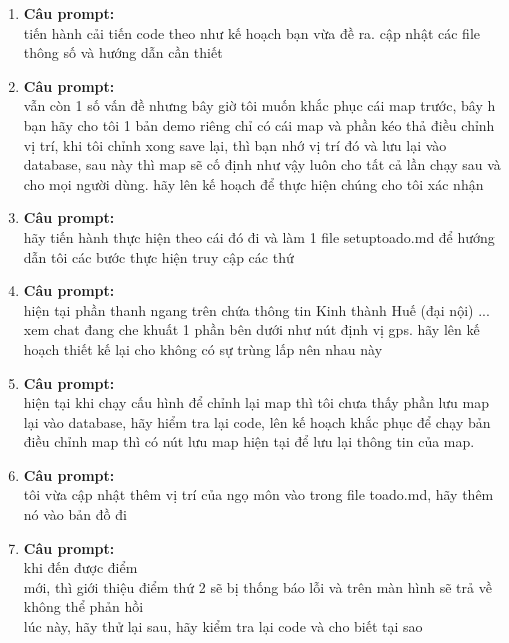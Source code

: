 \begin{enumerate}
\item \textbf{Câu prompt:} \\
\* tiến hành cải tiến code theo như kế hoạch bạn vừa đề ra. cập nhật các file thông số và hướng dẫn cần thiết \\



\item \textbf{Câu prompt:} \\
\* vẫn còn 1 số vấn đề nhưng bây giờ tôi muốn khắc phục cái map trước, bây h bạn hãy cho tôi 1 bản demo riêng chỉ có cái map và phần  kéo thả điều chỉnh vị trí, khi tôi chỉnh xong save lại, thì bạn nhớ vị trí đó và lưu lại vào database, sau này thì map sẽ cố định như vậy luôn cho tất cả lần chạy sau và cho mọi người dùng. hãy lên kế hoạch để thực hiện chúng cho tôi xác nhận \\



\item \textbf{Câu prompt:} \\
\* hãy tiến hành thực hiện theo cái đó đi và làm 1 file setuptoado.md để hướng dẫn tôi các bước thực hiện truy cập các thứ \\



\item \textbf{Câu prompt:} \\
\* hiện tại phần thanh ngang trên chứa thông tin Kinh thành Huế (đại nội) ... xem chat đang che khuất 1 phần bên dưới như nút định vị gps. hãy lên kế hoạch thiết kế lại cho không có sự trùng lấp nên nhau này \\



\item \textbf{Câu prompt:} \\
\* hiện tại khi chạy cấu hình để chỉnh lại map thì tôi chưa thấy phần lưu map lại vào database, hãy hiểm tra lại code, lên kế hoạch khắc phục để chạy bản điều chỉnh map thì có nút lưu map hiện tại để lưu lại thông tin của map. \\



\item \textbf{Câu prompt:} \\
\* tôi vừa cập nhật thêm vị trí của ngọ môn vào trong file toado.md, hãy thêm nó vào bản đồ đi \\



\item \textbf{Câu prompt:} \\
\* khi đến được điểm \\
       mới, thì giới thiệu điểm thứ 2 sẽ bị thống báo lỗi và trên màn hình sẽ trả về không thể phản hồi \\
       lúc này, hãy thử lại sau, hãy kiểm tra lại code và cho biết tại sao \\




\end{enumerate}
